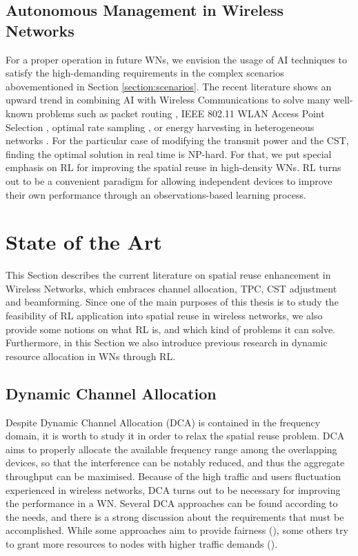 \documentclass[12pt, a4paper,twoside]{tesi_upf}
\begin{document}
		\section{Autonomous Management in Wireless Networks}
		\label{section:rl_vision}
			For a proper operation in future WNs, we envision the usage of AI techniques to satisfy the high-demanding requirements in the complex scenarios abovementioned in Section \ref{section:scenarios}. The recent literature shows an upward trend in combining AI with Wireless Communications to solve many well-known problems such as packet routing \cite{littman1993distributed}, IEEE 802.11 WLAN Access Point Selection \cite{bojovic2011supervised, bojovic2012neural}, optimal rate sampling \cite{combes2014optimal}, or energy harvesting in heterogeneous networks \cite{miozzo2015distributed}. For the particular case of modifying the transmit power and the CST, finding the optimal solution in real time is NP-hard. For that, we put special emphasis on RL for improving the spatial reuse in high-density WNs. RL turns out to be a convenient paradigm for allowing independent devices to improve their own performance through an observations-based learning process.
			
	\chapter{State of the Art}
	\label{section:state_of_the_art}
		This Section describes the current literature on spatial reuse enhancement in Wireless Networks, which embraces channel allocation, TPC, CST adjustment and beamforming. Since one of the main purposes of this thesis is to study the feasibility of RL application into spatial reuse in wireless networks, we also provide some notions on what RL is, and which kind of problems it can solve. Furthermore, in this Section we also introduce previous research in dynamic resource allocation in WNs through RL. 
			
		\section{Dynamic Channel Allocation}		
		\label{section:dca}					
			Despite Dynamic Channel Allocation (DCA) is contained in the frequency domain, it is worth to study it in order to relax the spatial reuse problem. DCA aims to properly allocate the available frequency range among the overlapping devices, so that the interference can be notably reduced, and thus the aggregate throughput can be maximised. Because of the high traffic and users fluctuation experienced in wireless networks, DCA turns out to be necessary for improving the performance in a WN. Several DCA approaches can be found according to the needs, and there is a strong discussion about the requirements that must be accomplished. While some approaches aim to provide fairness (\cite{ling2006joint}), some others try to grant more resources to nodes with higher traffic demands (\cite{wertz2004automatic}). 	
		
\end{document}
